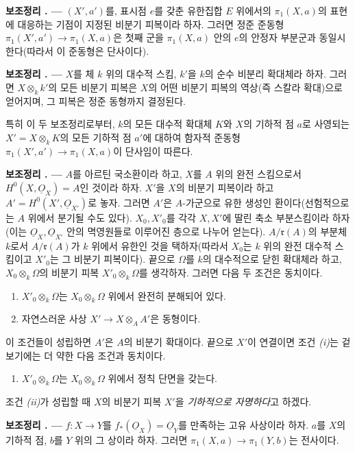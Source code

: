\documentclass[11pt,twoside,openany]{book}
\numberwithin{equation}{section}
\newcommand{\sourceunit}{front}
\newcommand{\src}[1]{%
  \phantomsection\hypertarget{src:\sourceunit:#1}{}%
  \marginpar{\raggedleft\footnotesize\sffamily #1}%
}
\newcommand{\Osh}{\underline{O}}
\theoremstyle{plain}
\theoremstyle{definition}
\theoremstyle{remark}
\newcommand{\result}[2]{%
  \par\medskip\noindent\textbf{#1%
  \if\relax\detokenize{#2}\relax\else\space#2\fi. ---}\enspace
}
\begin{document}
\result{보조정리}{1} $(X',a')$를, 표시점 $e$를 갖춘 유한집합 $E$
위에서의 $\pi_1(X,a)$의 표현에 대응하는 기점이 지정된 비분기 피복이라
하자. 그러면 정준 준동형
$\pi_1(X',a')\longrightarrow\pi_1(X,a)$은 첫째 군을 $\pi_1(X,a)$ 안의
$e$의 안정자 부분군과 동일시한다(따라서 이 준동형은 단사이다).

\result{보조정리}{2} $X$를 체 $k$ 위의 대수적 스킴, $k'$을 $k$의
순수 비분리 확대체라 하자. 그러면 $X\otimes_k k'$의 모든 비분기 피복은
$X$의 어떤 비분기 피복의 역상(즉 스칼라 확대)으로 얻어지며, 그 피복은
정준 동형까지 결정된다.

특히 이 두 보조정리로부터, $k$의 모든 대수적 확대체 $K$와
$X$의 기하적 점 $a$로 사영되는 $X'=X\otimes_k K$의 모든 기하적 점
$a'$에 대하여 함자적 준동형
$\pi_1(X',a')\longrightarrow\pi_1(X,a)$이 단사임이 따른다.

\result{보조정리}{3} $A$를 아르틴 국소환이라 하고, $X$를 $A$ 위의
완전 스킴으로서 $H^0(X,\Osh_X)=A$인 것이라 하자. $X'$을 $X$의 비분기
피복이라 하고 $A'=H^0(X',\Osh_{X'})$로 놓자. 그러면 $A'$은
$A$-가군으로 유한 생성인 환이다(선험적으로는 $A$ 위에서 분기될 수도
있다). $X_0,X'_0$를 각각 $X,X'$에 딸린 축소 부분스킴이라 하자(이는
$\Osh_X,\Osh_{X'}$ 안의 멱영원들로 이루어진 층으로 나누어 얻는다).
$A/\mathfrak r(A)$의 부분체 $k$로서 $A/\mathfrak r(A)$가 $k$ 위에서
유한인 것을 택하자(따라서 $X_0$는 $k$ 위의 완전 대수적 스킴이고
$X'_0$는 그 비분기 피복이다). 끝으로 $\Omega$를 $k$의 대수적으로 닫힌
확대체라 하고, $X_0\otimes_k\Omega$의 비분기 피복
$X'_0\otimes_k\Omega$를 생각하자. 그러면 다음 두 조건은 동치이다.
\begin{enumerate}
  \item[\textit{i.}] $X'_0\otimes_k\Omega$는
    $X_0\otimes_k\Omega$ 위에서 완전히 분해되어 있다.
  \item[\textit{ii.}] 자연스러운 사상
    $X'\longrightarrow X\otimes_A A'$은 동형이다.
\end{enumerate}
이 조건들이 성립하면 $A'$은 $A$의 비분기 확대이다. 끝으로 $X'$이
연결이면 조건 \textit{(i)}는 겉보기에는 더 약한 다음 조건과 동치이다.
\begin{enumerate}
  \item[\textit{i bis.}] $X'_0\otimes_k\Omega$는
    $X_0\otimes_k\Omega$ 위에서 정칙 단면을 갖는다.
\end{enumerate}
조건 \textit{(ii)}가 성립할 때 $X$의 비분기 피복 $X'$을
\emph{기하적으로 자명하다}고 하겠다.

\src{212}
\result{보조정리}{4} $f:X\longrightarrow Y$를
$f_*(\Osh_X)=\Osh_Y$를 만족하는 고유 사상이라 하자. $a$를 $X$의
기하적 점, $b$를 $Y$ 위의 그 상이라 하자. 그러면
$\pi_1(X,a)\longrightarrow\pi_1(Y,b)$는 전사이다.
\end{document}
